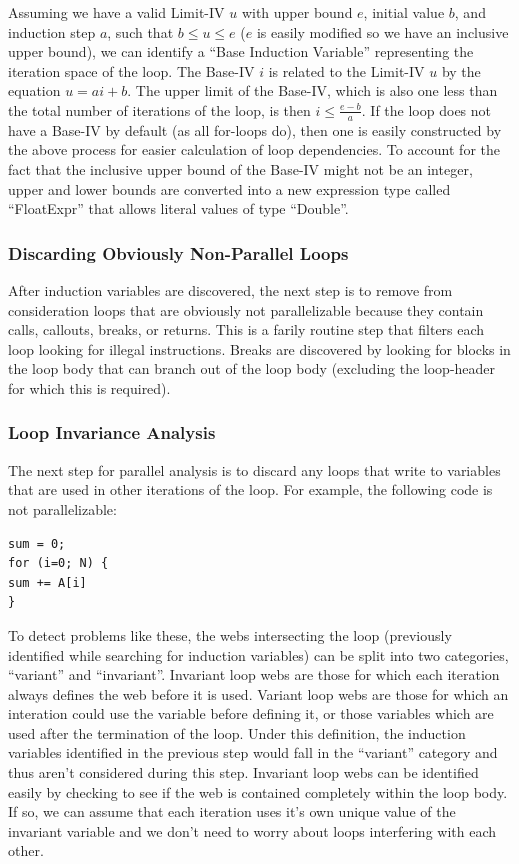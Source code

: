 \documentclass[11pt]{article}
\begin{document}
Assuming we have a valid Limit-IV $u$ with upper bound $e$, initial value
$b$, and induction step $a$, such that $b \leq u \leq e$ ($e$ is easily
modified so we have an inclusive upper bound), we can identify a
``Base Induction Variable'' representing the iteration space of the
loop. The Base-IV $i$ is related to the Limit-IV $u$ by the equation
$u = ai + b$. The upper limit of the Base-IV, which is also one less than the total
number of iterations of the loop, is then $i \leq \frac{e-b}{a}$. If
the loop does not have a Base-IV by default (as all for-loops do),
then one is easily constructed by the above process for easier
calculation of loop dependencies. To account for the fact that the
inclusive upper bound of the Base-IV might not be an integer, upper
and lower bounds are converted into a new expression type called
``FloatExpr'' that allows literal values of type ``Double''.

\subsubsection {Discarding Obviously Non-Parallel Loops} 

After induction variables are discovered, the next step is to remove
from consideration loops that are obviously not parallelizable because
they contain calls, callouts, breaks, or returns. This is a farily
routine step that filters each loop looking for illegal
instructions. Breaks are discovered by looking for blocks in the loop
body that can branch out of the loop body (excluding the loop-header for
which this is required). 

\subsubsection {Loop Invariance Analysis} 

The next step for parallel analysis is to discard any loops that write
to variables that are used in other iterations of the loop. For
example, the following code is not parallelizable: 

\begin{verbatim}
sum = 0;
for (i=0; N) { 
sum += A[i] 
}
\end{verbatim}

To detect problems like these, the webs intersecting the loop
(previously identified while searching for induction variables) can be
split into two categories, ``variant'' and ``invariant''. Invariant
loop webs are those for which each iteration always defines the web
before it is used. Variant loop webs are those for which an interation
could use the variable before defining it, or those variables which are used
after the termination of the loop. Under this definition, the
induction variables identified in the previous step would fall in the
``variant'' category and thus aren't considered during this
step. Invariant loop webs can be identified easily by checking to see
if the web is contained completely within the loop body. If so, we can
assume that each iteration uses it's own unique value of the invariant
variable and we don't need to worry about loops interfering with each
other. 
\end{document}
